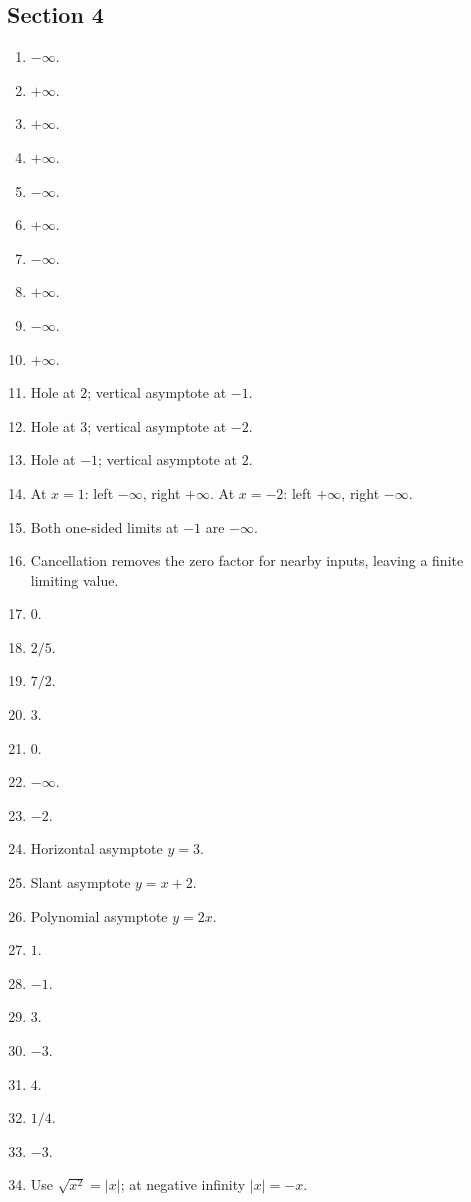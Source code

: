 \documentclass[11pt,openany]{book}
\theoremstyle{bgplain}
\begin{document}
\subsection*{Section 4}

\begin{enumerate}[label=\textbf{4.\arabic*}]
  \item \(-\infty\).
  \item \(+\infty\).
  \item \(+\infty\).
  \item \(+\infty\).
  \item \(-\infty\).
  \item \(+\infty\).
  \item \(-\infty\).
  \item \(+\infty\).
  \item \(-\infty\).
  \item \(+\infty\).
  \item Hole at \(2\); vertical asymptote at \(-1\).
  \item Hole at \(3\); vertical asymptote at \(-2\).
  \item Hole at \(-1\); vertical asymptote at \(2\).
  \item At \(x=1\): left \(-\infty\), right \(+\infty\). At \(x=-2\): left \(+\infty\), right \(-\infty\).
  \item Both one-sided limits at \(-1\) are \(-\infty\).
  \item Cancellation removes the zero factor for nearby inputs, leaving a finite limiting value.
  \item \(0\).
  \item \(2/5\).
  \item \(7/2\).
  \item \(3\).
  \item \(0\).
  \item \(-\infty\).
  \item \(-2\).
  \item Horizontal asymptote \(y=3\).
  \item Slant asymptote \(y=x+2\).
  \item Polynomial asymptote \(y=2x\).
  \item \(1\).
  \item \(-1\).
  \item \(3\).
  \item \(-3\).
  \item \(4\).
  \item \(1/4\).
  \item \(-3\).
  \item Use \(\sqrt{x^2}=|x|\); at negative infinity \(|x|=-x\).

\end{enumerate}
\end{document}
